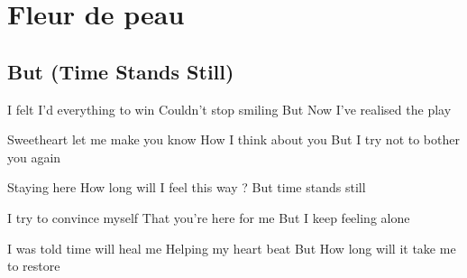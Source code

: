 \documentclass{article}
\newenvironment{album}[1]%
{%
  \section*{#1}
}%
{%
}
\newenvironment{song}[1]%
{%
  \subsection*{\textbf{#1}}
  \begin{multicols*}{2}
}%
{%
  \end{multicols*}
  \newpage
}
\newenvironment{couplet} %
{%
  \verbatim
}%
{% end code
  \endverbatim
}
\newenvironment{refrain} %
{%
  \verbatim
}%
{% end code
  \endverbatim
}
\begin{document}
\begin{album}{Fleur de peau}
\begin{song}{But (Time Stands Still)}
\begin{couplet}
I felt I’d everything to win
Couldn’t stop smiling
But
Now I’ve realised the play  
\end{couplet}
\begin{couplet}
Sweetheart let me make you know
How I think about you
But
I try not to bother you again
\end{couplet}
\begin{refrain}
Staying here
How long will I feel this way ?
But time stands still
\end{refrain}
\begin{couplet}
I try to convince myself
That you’re here for me
But
I keep feeling alone
\end{couplet}
\begin{couplet}
I was told time will heal me
Helping my heart beat
But
How long will it take me to restore

\end{couplet}
\end{song}
\end{album}
\end{document}
